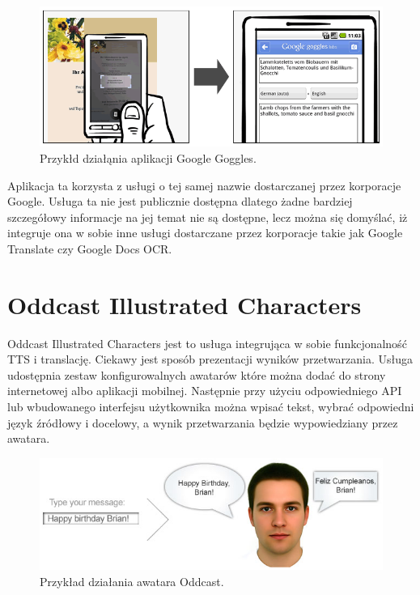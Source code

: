 \begin{figure}[!h]
	\centering
	\includegraphics[scale=0.5]{google_goggles.png}
	\caption{Przykłd działąnia aplikacji Google Goggles\cite{googlegoggles}. }\label{fig:google_goggles}
\end{figure}

Aplikacja ta korzysta z usługi o tej samej nazwie dostarczanej przez korporacje Google. Usługa ta nie jest publicznie dostępna dlatego żadne bardziej szczegółowy informacje na jej temat nie są dostępne, lecz można się domyślać, iż integruje ona w sobie inne usługi dostarczane przez korporacje takie jak Google Translate czy Google Docs OCR. 

\section {Oddcast Illustrated Characters}

Oddcast Illustrated Characters\cite{oddcasts} jest to usługa integrująca w sobie funkcjonalność TTS i translację. Ciekawy jest sposób prezentacji wyników przetwarzania. Usługa udostępnia zestaw konfigurowalnych awatarów które można dodać do strony internetowej albo aplikacji mobilnej. Następnie przy użyciu odpowiedniego API lub wbudowanego interfejsu użytkownika można wpisać tekst, wybrać odpowiedni język źródłowy i docelowy, a wynik przetwarzania będzie wypowiedziany przez awatara.

\begin{figure}[!h]
	\centering
	\includegraphics[scale=0.60]{oddcast.png}
	\caption{Przykład działania awatara Oddcast\cite{oddcasts}. }\label{fig:oddcast}
\end{figure}

